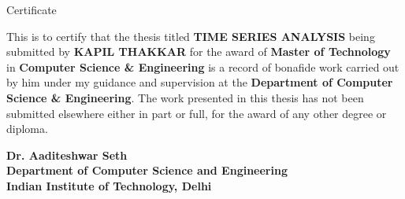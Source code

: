 \begin{center}
\LARGE{ Certificate} 
\end{center}

\vspace{0.5in}

This is to certify that the thesis titled {\bfseries TIME SERIES ANALYSIS} being submitted by
{\bfseries KAPIL THAKKAR} for the award of {\bfseries Master of Technology} in {\bfseries Computer Science \& Engineering} is a record of bonafide work carried out by him under my guidance and supervision at the {\bfseries Department of Computer Science \& Engineering}. The work presented in this thesis has not been submitted elsewhere either in part or full, for the award of any other degree or diploma.

\vspace{1.5in}


{\bfseries Dr. Aaditeshwar Seth} \\
{\bfseries Department of Computer Science and Engineering} \\
{\bfseries Indian Institute of Technology, Delhi}\\ 
